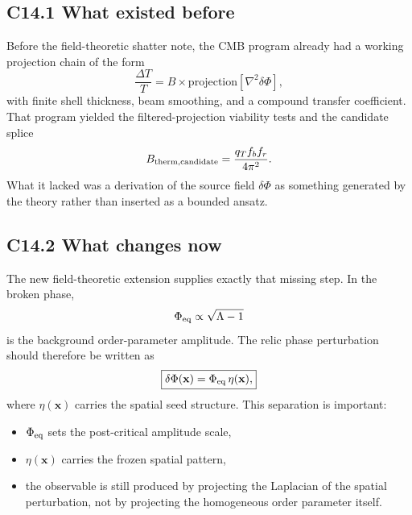 \documentclass[11pt]{article}
\begin{document}
\subsection*{C14.1 What existed before}
Before the field-theoretic shatter note, the CMB program already had a working projection chain of the form
\begin{equation}
\frac{\Delta T}{T}=B\times \mathrm{projection}\!\left[\nabla^2\delta\Phi\right],
\end{equation}
with finite shell thickness, beam smoothing, and a compound transfer coefficient. That program yielded the filtered-projection viability tests and the candidate splice
\begin{equation}
B_{\rm therm,candidate}=\frac{q_T f_b f_r}{4\pi^2}.
\end{equation}
What it lacked was a derivation of the source field $\delta\Phi$ as something generated by the theory rather than inserted as a bounded ansatz.

\subsection*{C14.2 What changes now}
The new field-theoretic extension supplies exactly that missing step. In the broken phase,
\begin{equation}
\Phi_{\rm eq}\propto \sqrt{\Lambda-1}
\end{equation}
is the background order-parameter amplitude. The relic phase perturbation should therefore be written as
\begin{equation}
\boxed{\delta\Phi(\mathbf x)=\Phi_{\rm eq}\,\eta(\mathbf x),}
\end{equation}
where $\eta(\mathbf x)$ carries the spatial seed structure. This separation is important:
\begin{itemize}[leftmargin=1.6em]
  \item $\Phi_{\rm eq}$ sets the post-critical amplitude scale,
  \item $\eta(\mathbf x)$ carries the frozen spatial pattern,
  \item the observable is still produced by projecting the Laplacian of the spatial perturbation, not by projecting the homogeneous order parameter itself.
\end{itemize}
\end{document}
